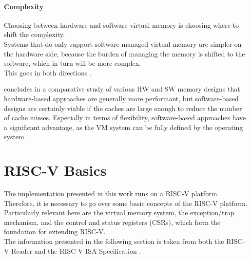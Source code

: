 \paragraph{Complexity} Choosing between hardware and software virtual memory is choosing where to shift the complexity.\\
Systems that do only support software managed virtual memory are simpler on the hardware side, because the burden of managing the memory is shifted to the software, which in turn will be more complex.\\
This goes in both directions \cite{jacob1998virtualissues}.

\cite{jacob1998look} concludes in a comparative study of various HW and SW memory designs
that hardware-based approaches are generally more performant, but software-based designs are certainly
viable if the caches are large enough to reduce the number of cache misses.
Especially in terms of flexibility, software-based approaches have a significant advantage,
as the VM system can be fully defined by the operating system.








\section{RISC-V Basics}
The implementation presented in this work runs on a RISC-V platform. Therefore, it is necessary
to go over some basic concepts of the RISC-V platform. Particularly relevant here are the virtual
memory system, the exception/trap mechanism, and the control and status registers (CSRs), which
form the foundation for extending RISC-V.\\
The information presented in the following section is taken from both the RISC-V Reader \cite{riscvreader} and the RISC-V ISA Specification \cite{RISCVInstructionSet}.


